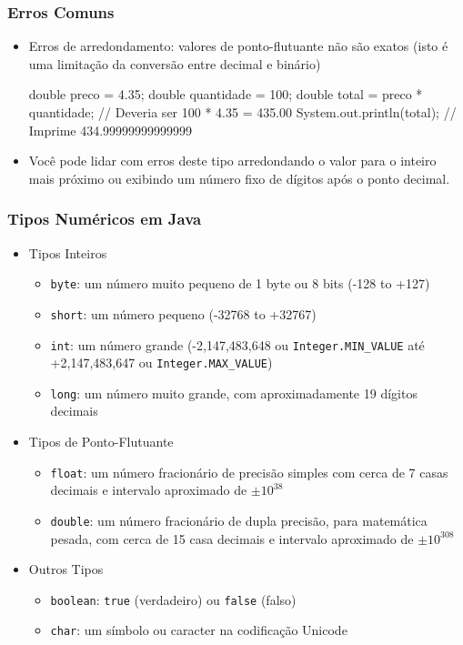 \documentclass[xcolor={dvipsnames,table},aspectratio=169]{beamer}
\begin{document}
\begin{frame}[fragile]\frametitle{Erros Comuns}
\begin{itemize}
	\item Erros de arredondamento: valores de ponto-flutuante não são exatos (isto é uma limitação da conversão entre decimal e binário)
\begin{javacode}
double preco = 4.35;
double quantidade = 100;
double total = preco * quantidade;
// Deveria ser 100 * 4.35 = 435.00
System.out.println(total); // Imprime 434.99999999999999
\end{javacode}
	\item Você pode lidar com erros deste tipo arredondando o valor para o inteiro mais próximo ou exibindo um número fixo de dígitos após o ponto decimal.
\end{itemize}
\end{frame}

\begin{frame}\frametitle{Tipos Numéricos em Java}
\begin{itemize}
	\item Tipos Inteiros
	\begin{itemize}
		\item \texttt{byte}: um número muito pequeno de 1 byte ou 8 bits (-128 to +127)
		\item \texttt{short}: um número pequeno (-32768 to +32767)
		\item \texttt{int}: um número grande (-2,147,483,648 ou \texttt{Integer.MIN\_VALUE} até +2,147,483,647 ou \texttt{Integer.MAX\_VALUE})
		\item \texttt{long}: um número muito grande, com aproximadamente 19 dígitos decimais
	\end{itemize}
	\item Tipos de Ponto-Flutuante
	\begin{itemize}
		\item \texttt{float}: um número fracionário de precisão simples com cerca de 7 casas decimais e intervalo aproximado de $\pm 10^{38}$
		\item \texttt{double}: um número fracionário de dupla precisão, para matemática pesada, com cerca de 15 casa decimais e intervalo aproximado de $\pm 10^{308}$
	\end{itemize}
	\item Outros Tipos
	\begin{itemize}
		\item \texttt{boolean}: \texttt{true} (verdadeiro) ou \texttt{false} (falso)
		\item \texttt{char}: um símbolo ou caracter na codificação Unicode
	\end{itemize}
\end{itemize}
\end{frame}
\end{document}

